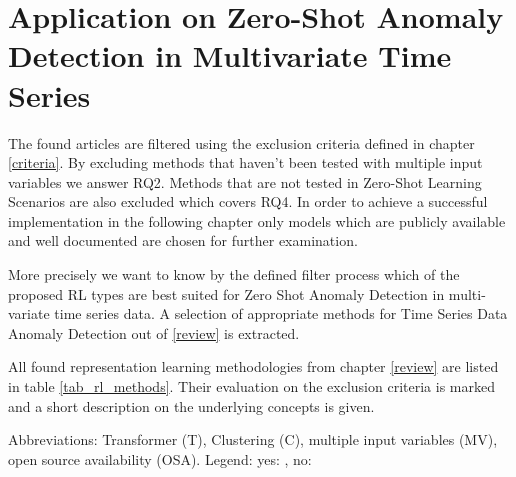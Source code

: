 \section{Application on Zero-Shot Anomaly Detection in Multivariate Time Series}\label{application}
The found articles are filtered using the exclusion criteria defined in chapter \ref{criteria}. By excluding methods that haven't been tested with multiple input variables we answer RQ2. Methods that are not tested in Zero-Shot Learning Scenarios are also excluded which covers RQ4.  In order to achieve a successful implementation in the following chapter only models which are publicly available and well documented are chosen for further examination.

More precisely we want to know by the defined filter process which of the proposed RL types are best suited for Zero Shot Anomaly Detection in multi-variate time series data. A selection of appropriate methods for Time Series Data Anomaly Detection out of \ref{review} is extracted.

All found representation learning methodologies from chapter \ref{review} are listed in table \ref{tab_rl_methods}. Their evaluation on the exclusion criteria is marked and a short description on the underlying concepts is given.
 \begin{table}
   \caption{Abbreviations: Transformer (T), Clustering (C), multiple input variables (MV), open source availability (OSA). Legend: yes: \cmark, no: \xmark}\label{tab_rl_methods}
   
 \end{table}
